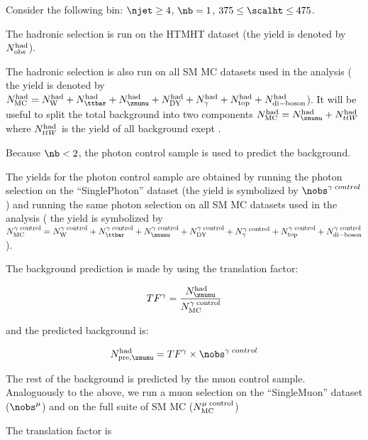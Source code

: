 \clearpage

Consider the following bin: $\njet \ge 4$, $\nb = 1$, $ 375 \leq \scalht \leq 475$.

The hadronic selection is run on the HTMHT dataset (the yield is denoted by $N_{\rm obs}^{\rm had}$).

The hadronic selection is also run on all SM MC datasets used in the analysis ( the yield is denoted by
$N_{\rm MC}^{\rm had} = N_{\rm W}^{\rm had} + N_{\ttbar}^{\rm had} + N_{\znunu}^{\rm had} +
N_{\rm DY}^{\rm had} + N_{\gamma}^{\rm had} + N_{\rm top}^{\rm had} + N_{\rm di-boson}^{\rm had}$). 
It will be useful to split the total background into two components $N_{\rm MC}^{\rm had} = N_{\znunu}^{\rm had} + N_{ttW}^{\rm had}$
where $N_{ttW}^{\rm had}$ is the yield of all background exept \znunu.  

Because $\nb < 2$, the photon control sample is used to predict the \znunu background. 

The yields for the photon control sample are obtained by running the photon selection on 
the ``SinglePhoton'' dataset (the yield is symbolized by ${\nobs^{\gamma\;control}}$) and 
running the same photon selection on all SM MC datasets used in the analysis (
the yield is symbolized by $N_{\rm MC}^{\rm \gamma\; control} = N_{\rm W}^{\rm \gamma\; control} + N_{\ttbar}^{\rm \gamma\; control} + N_{\znunu}^{\rm \gamma\; control} +
N_{\rm DY}^{\rm \gamma\; control} + N_{\gamma}^{\rm \gamma\; control} + N_{\rm top}^{\rm \gamma\; control} + N_{\rm di-boson}^{\rm \gamma\; control}$). 

The background prediction is made by using the translation factor:

\begin{equation}
  \label{equ:ratio-denom}
  TF^{\gamma} = \frac{N_{\znunu}^{\rm had}}{N_{\rm MC}^{\rm \gamma\; control}}
\end{equation}

and the predicted \znunu background is:

\begin{equation}
  \label{equ:pre-znunud}
  N_{\rm pre, \znunu}^{\rm had} = TF^{\gamma} \times {\nobs^{\gamma\;control}}
\end{equation}

The rest of the background is predicted by the muon control sample. Analoguously to the above, we run a 
muon selection on the ``SingleMuon'' dataset (${\nobs^\mu}$) and on the full suite of SM MC ($N_{\rm MC}^{\rm \mu\; control}$)

The translation factor is 

